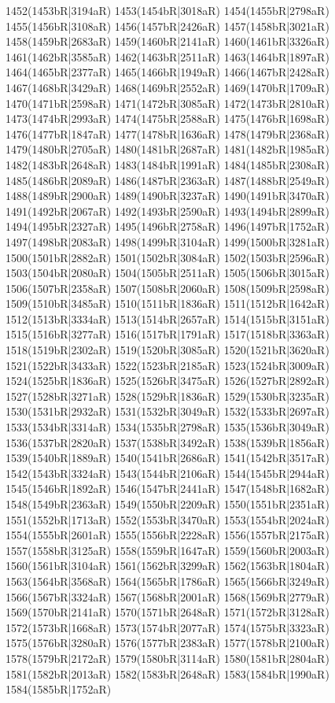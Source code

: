 1452(1453bR|3194aR) 1453(1454bR|3018aR) 1454(1455bR|2798aR) 1455(1456bR|3108aR) 1456(1457bR|2426aR) 1457(1458bR|3021aR) \\1458(1459bR|2683aR) 1459(1460bR|2141aR) 1460(1461bR|3326aR) 1461(1462bR|3585aR) 1462(1463bR|2511aR) 1463(1464bR|1897aR) 1464(1465bR|2377aR) 1465(1466bR|1949aR) 1466(1467bR|2428aR) \\1467(1468bR|3429aR) 1468(1469bR|2552aR) 1469(1470bR|1709aR) 1470(1471bR|2598aR) 1471(1472bR|3085aR) 1472(1473bR|2810aR) 1473(1474bR|2993aR) 1474(1475bR|2588aR) 1475(1476bR|1698aR) \\1476(1477bR|1847aR) 1477(1478bR|1636aR) 1478(1479bR|2368aR) 1479(1480bR|2705aR) 1480(1481bR|2687aR) 1481(1482bR|1985aR) 1482(1483bR|2648aR) 1483(1484bR|1991aR) 1484(1485bR|2308aR) \\1485(1486bR|2089aR) 1486(1487bR|2363aR) 1487(1488bR|2549aR) 1488(1489bR|2900aR) 1489(1490bR|3237aR) 1490(1491bR|3470aR) 1491(1492bR|2067aR) 1492(1493bR|2590aR) 1493(1494bR|2899aR) \\1494(1495bR|2327aR) 1495(1496bR|2758aR) 1496(1497bR|1752aR) 1497(1498bR|2083aR) 1498(1499bR|3104aR) 1499(1500bR|3281aR) 1500(1501bR|2882aR) 1501(1502bR|3084aR) 1502(1503bR|2596aR) \\1503(1504bR|2080aR) 1504(1505bR|2511aR) 1505(1506bR|3015aR) 1506(1507bR|2358aR) 1507(1508bR|2060aR) 1508(1509bR|2598aR) 1509(1510bR|3485aR) 1510(1511bR|1836aR) 1511(1512bR|1642aR) \\1512(1513bR|3334aR) 1513(1514bR|2657aR) 1514(1515bR|3151aR) 1515(1516bR|3277aR) 1516(1517bR|1791aR) 1517(1518bR|3363aR) 1518(1519bR|2302aR) 1519(1520bR|3085aR) 1520(1521bR|3620aR) \\1521(1522bR|3433aR) 1522(1523bR|2185aR) 1523(1524bR|3009aR) 1524(1525bR|1836aR) 1525(1526bR|3475aR) 1526(1527bR|2892aR) 1527(1528bR|3271aR) 1528(1529bR|1836aR) 1529(1530bR|3235aR) \\1530(1531bR|2932aR) 1531(1532bR|3049aR) 1532(1533bR|2697aR) 1533(1534bR|3314aR) 1534(1535bR|2798aR) 1535(1536bR|3049aR) 1536(1537bR|2820aR) 1537(1538bR|3492aR) 1538(1539bR|1856aR) \\1539(1540bR|1889aR) 1540(1541bR|2686aR) 1541(1542bR|3517aR) 1542(1543bR|3324aR) 1543(1544bR|2106aR) 1544(1545bR|2944aR) 1545(1546bR|1892aR) 1546(1547bR|2441aR) 1547(1548bR|1682aR) \\1548(1549bR|2363aR) 1549(1550bR|2209aR) 1550(1551bR|2351aR) 1551(1552bR|1713aR) 1552(1553bR|3470aR) 1553(1554bR|2024aR) 1554(1555bR|2601aR) 1555(1556bR|2228aR) 1556(1557bR|2175aR) \\1557(1558bR|3125aR) 1558(1559bR|1647aR) 1559(1560bR|2003aR) 1560(1561bR|3104aR) 1561(1562bR|3299aR) 1562(1563bR|1804aR) 1563(1564bR|3568aR) 1564(1565bR|1786aR) 1565(1566bR|3249aR) \\1566(1567bR|3324aR) 1567(1568bR|2001aR) 1568(1569bR|2779aR) 1569(1570bR|2141aR) 1570(1571bR|2648aR) 1571(1572bR|3128aR) 1572(1573bR|1668aR) 1573(1574bR|2077aR) 1574(1575bR|3323aR) \\1575(1576bR|3280aR) 1576(1577bR|2383aR) 1577(1578bR|2100aR) 1578(1579bR|2172aR) 1579(1580bR|3114aR) 1580(1581bR|2804aR) 1581(1582bR|2013aR) 1582(1583bR|2648aR) 1583(1584bR|1990aR) \\1584(1585bR|1752aR) 